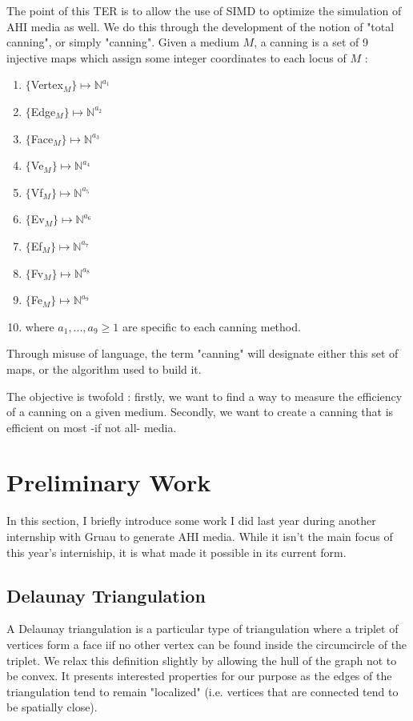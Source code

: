 \documentclass{article}
\begin{document}
The point of this TER is to allow the use of SIMD to optimize the simulation of AHI media as well. We do this through the development of the notion of "total canning", or simply "canning". Given a medium $M$, a canning is a set of 9 injective maps which assign some integer coordinates to each locus of $M$ :
\begin{enumerate}
	\item $\{$Vertex$_M\} \mapsto \mathbb{N}^{a_1}$
	\item $\{$Edge$_M\} \mapsto \mathbb{N}^{a_2}$
	\item $\{$Face$_M\} \mapsto \mathbb{N}^{a_3}$
	\item $\{$Ve$_M\} \mapsto \mathbb{N}^{a_4}$
	\item $\{$Vf$_M\} \mapsto \mathbb{N}^{a_5}$
	\item $\{$Ev$_M\} \mapsto \mathbb{N}^{a_6}$
	\item $\{$Ef$_M\} \mapsto \mathbb{N}^{a_7}$
	\item $\{$Fv$_M\} \mapsto \mathbb{N}^{a_8}$
	\item $\{$Fe$_M\} \mapsto \mathbb{N}^{a_9}$
	\item[] where $a_1, ..., a_9 \geq 1$ are specific to each canning method.
\end{enumerate}
Through misuse of language, the term "canning" will designate either this set of maps, or the algorithm used to build it.

The objective is twofold : firstly, we want to find a way to measure the efficiency of a canning on a given medium. Secondly, we want to create a canning that is efficient on most -if not all- media.

\section{Preliminary Work}

In this section, I briefly introduce some work I did last year during another internship with Gruau to generate AHI media. While it isn't the main focus of this year's interniship, it is what made it possible in its current form.

\subsection{Delaunay Triangulation}

A Delaunay triangulation is a particular type of triangulation where a triplet of vertices form a face iif no other vertex can be found inside the circumcircle of the triplet. We relax this definition slightly by allowing the hull of the graph not to be convex. It presents interested properties for our purpose as the edges of the triangulation tend to remain "localized" (i.e. vertices that are connected tend to be spatially close).
\end{document}
